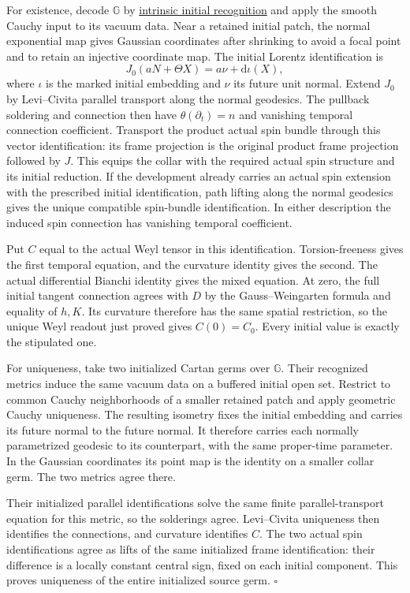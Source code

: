 \documentclass[
  english,
  11pt,
  reqno]{amsart}
\begin{document}
For existence, decode \(\mathbb G\) by
\hyperref[thm:online-intrinsic-gradient-vacuum-recognition]{intrinsic
initial recognition} and apply the smooth Cauchy input to its vacuum
data. Near a retained initial patch, the normal exponential map gives
Gaussian coordinates after shrinking to avoid a focal point and to
retain an injective coordinate map. The initial Lorentz identification
is%
\[
J_0(aN+\Theta X)=a\nu+\mathrm d\iota(X),
\] where \(\iota\) is the marked initial embedding and \(\nu\) its
future unit normal. Extend \(J_0\) by Levi--Civita parallel transport
along the normal geodesics. The pullback soldering and connection then
have \(\theta(\partial_t)=n\) and vanishing temporal connection
coefficient. Transport the product actual spin bundle through this
vector identification: its frame projection is the original product
frame projection followed by \(J\). This equips the collar with the
required actual spin structure and its initial reduction. If the
development already carries an actual spin extension with the prescribed
initial identification, path lifting along the normal geodesics gives
the unique compatible spin-bundle identification. In either description
the induced spin connection has vanishing temporal coefficient.

Put \(C\) equal to the actual Weyl tensor in this identification.
Torsion-freeness gives the first temporal equation, and the curvature
identity gives the second. The actual differential Bianchi identity
gives the mixed equation. At zero, the full initial tangent connection
agrees with \(D\) by the Gauss--Weingarten formula and equality of
\(h,K\). Its curvature therefore has the same spatial restriction, so
the unique Weyl readout just proved gives \(C(0)=C_0\). Every initial
value is exactly the stipulated one.

For uniqueness, take two initialized Cartan germs over \(\mathbb G\).
Their recognized metrics induce the same vacuum data on a buffered
initial open set. Restrict to common Cauchy neighborhoods of a smaller
retained patch and apply geometric Cauchy uniqueness. The resulting
isometry fixes the initial embedding and carries its future normal to
the future normal. It therefore carries each normally parametrized
geodesic to its counterpart, with the same proper-time parameter. In the
Gaussian coordinates its point map is the identity on a smaller collar
germ. The two metrics agree there.

Their initialized parallel identifications solve the same finite
parallel-transport equation for this metric, so the solderings agree.
Levi--Civita uniqueness then identifies the connections, and curvature
identifies \(C\). The two actual spin identifications agree as lifts of
the same initialized frame identification: their difference is a locally
constant central sign, fixed on each initial component. This proves
uniqueness of the entire initialized source germ. \hfill\(\square\)
\end{document}
